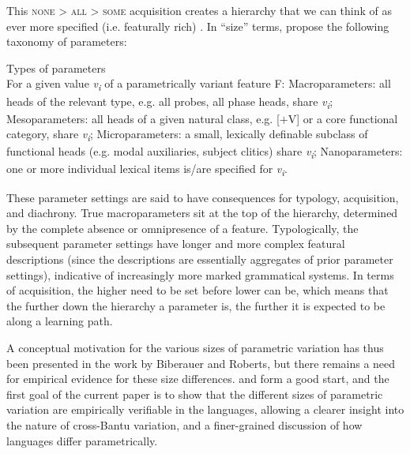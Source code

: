 \documentclass[output=paper]{langsci/langscibook}
\begin{document}
This \textsc{none > all > some} acquisition creates a hierarchy that we can think of as
ever more specified (i.e. featurally rich) . In “size” terms,
\textcite{BibRob2015,BibRob2016} propose the following taxonomy of parameters:

\ea\label{ex:vdwal:3.6} Types of parameters\\
    For a given value \emph{v\textsubscript{i}} of a parametrically variant
    feature F:
    \ea Macroparameters: all heads of the relevant type, e.g. all probes, all
    phase heads, share \emph{v\textsubscript{i}};
    \ex Mesoparameters: all heads of a given natural class, e.g. [$+$V] or a core
    functional category, share \emph{v\textsubscript{i}};
    \ex Microparameters: a small, lexically definable subclass of functional
    heads (e.g. modal auxiliaries, subject clitics) share
    \emph{v\textsubscript{i}};
    \ex Nanoparameters: one or more individual lexical items is/are specified
    for \emph{v\textsubscript{i}}.
    \z
\z

These parameter settings are said to have consequences for typology,
acquisition, and diachrony. True macroparameters sit at the top of the
hierarchy, determined by the complete absence or omnipresence of a feature.
Typologically, the subsequent parameter settings have longer and more complex
featural descriptions (since the descriptions are essentially aggregates of
prior parameter settings), indicative of increasingly more marked grammatical
systems. In terms of acquisition, the higher  need to be set before
lower  can be, which means that the further down the hierarchy a
parameter is, the further it is expected to be along a learning path.

A conceptual motivation for the various sizes of parametric variation has thus
been presented in the work by Biberauer and Roberts, but there remains a need
for empirical evidence for these size differences.
\textcite{BibRob2012,BibRob2016} and \citet{Ledgeway2013} form a good start,
and the first goal of the current paper is to show that the different sizes of
parametric variation are empirically verifiable in the  languages,
allowing a clearer insight into the nature of cross-Bantu variation, and a
finer-grained discussion of how languages differ parametrically.
\end{document}
